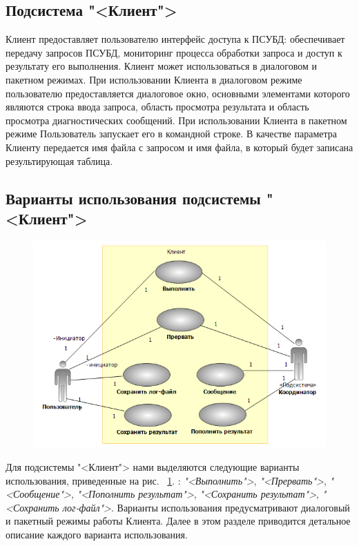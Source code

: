 \documentclass[11pt,oneside]{article}
\begin{document}
	\subsection{Подсистема "<Клиент">}\label{S_Client}
	\par Клиент предоставляет пользователю интерфейс доступа к ПСУБД: обеспечивает передачу запросов ПСУБД, мониторинг процесса обработки запроса и доступ к результату его выполнения. Клиент может использоваться в диалоговом и пакетном режимах. При использовании Клиента в диалоговом режиме пользователю предоставляется диалоговое окно, основными элементами которого являются строка ввода запроса, область просмотра результата и область просмотра диагностических сообщений. При использовании Клиента в пакетном режиме Пользователь запускает его в командной строке. В качестве параметра Клиенту передается имя файла с запросом и имя файла, в который будет записана результирующая таблица.
	
	\subsection{Варианты использования подсистемы "<Клиент">}\label{S_ClientUseCase}
	
	\begin{figure}[h]
		\centering
		\includegraphics[width=0.9\linewidth]{clientUCDiagram}
		\caption{}
		\label{fig:clientucdiagram}
	\end{figure}
	
	
	Для подсистемы "<Клиент"> нами выделяются следующие варианты использования, приведенные на рис. ~\ref{fig:clientucdiagram}.
	: \textit{"<Выполнить">}, \textit{"<Прервать">}, \textit{"<Сообщение">}, \textit{"<Пополнить результат">}, \textit{"<Сохранить результат">}, \textit{"<Сохранить лог-файл">}. Варианты использования предусматривают диалоговый и пакетный режимы работы Клиента. Далее в этом разделе приводится детальное описание каждого варианта использования.
	
\end{document}
